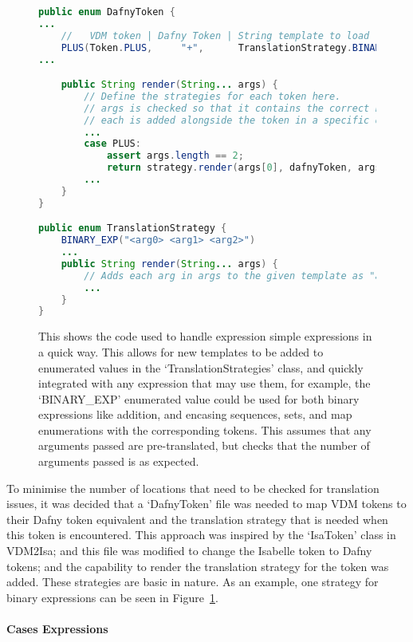 \documentclass{entcs}
\begin{document}
\begin{figure}[h]
	\begin{center}
        \begin{lstlisting}[language=Java]
public enum DafnyToken {
...
    //   VDM token | Dafny Token | String template to load
    PLUS(Token.PLUS,     "+",      TranslationStrategy.BINARY_EXP)
...

    public String render(String... args) {
        // Define the strategies for each token here. 
        // args is checked so that it contains the correct number of args.
        // each is added alongside the token in a specific order, e.g.
        ...
        case PLUS: 
            assert args.length == 2;
            return strategy.render(args[0], dafnyToken, args[1]);
        ...
    }
}

public enum TranslationStrategy {
    BINARY_EXP("<arg0> <arg1> <arg2>")
    ...
    public String render(String... args) {
        // Adds each arg in args to the given template as "argN" where N is it's position in the 'args' array
        ...
    }
}
        \end{lstlisting}
		\caption{This shows the code used to handle expression simple expressions in a quick way. This allows for new templates to be added to enumerated values in the `TranslationStrategies' class, and quickly integrated with any expression that may use them, for example, the `BINARY\_EXP' enumerated value could be used for both binary expressions like addition, and encasing sequences, sets, and map enumerations with the corresponding tokens. This assumes that any arguments passed are pre-translated, but checks that the number of arguments passed is as expected.}\label{fig:binary_expressions}
	\end{center}
\end{figure}

To minimise the number of locations that need to be checked for translation issues, it was decided that a `DafnyToken' file was needed to map VDM tokens to their Dafny token equivalent and the translation strategy that is needed when this token is encountered. This approach was inspired by the `IsaToken' class in VDM2Isa; and this file was modified to change the Isabelle token to Dafny tokens; and the capability to render the translation strategy for the token was added. These strategies are basic in nature. As an example, one strategy for binary expressions can be seen in Figure~\ref{fig:binary_expressions}. 

\paragraph{Cases Expressions}
\end{document}
